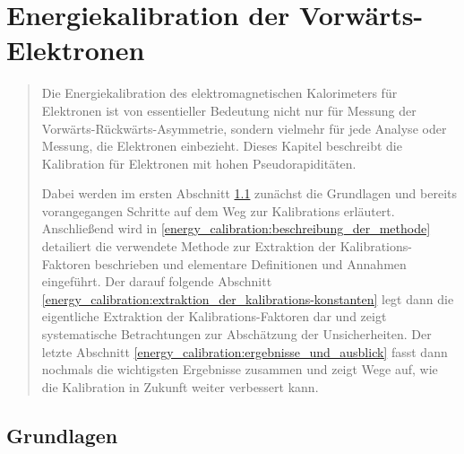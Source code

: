 


%
\chapter{Energiekalibration der Vorwärts-Elektronen}
\label{energy_calibration}

\begin{quote}
    Die Energiekalibration des elektromagnetischen Kalorimeters für Elektronen 
    ist von essentieller Bedeutung nicht nur für Messung der
    Vorwärts-Rückwärts-Asymmetrie, sondern vielmehr für jede Analyse oder
    Messung, die Elektronen einbezieht. Dieses Kapitel beschreibt die
    Kalibration für Elektronen mit hohen Pseudorapiditäten.

    Dabei werden im ersten Abschnitt \ref{energy_calibration:grundlagen}
    zunächst die Grundlagen und bereits vorangegangen Schritte auf dem Weg zur
    Kalibrations erläutert. Anschließend wird in
    \ref{energy_calibration:beschreibung_der_methode} detailiert die verwendete
    Methode zur Extraktion der Kalibrations-Faktoren beschrieben und elementare
    Definitionen und Annahmen eingeführt. Der darauf folgende Abschnitt
    \ref{energy_calibration:extraktion_der_kalibrations-konstanten} legt dann
    die eigentliche Extraktion der Kalibrations-Faktoren dar und zeigt
    systematische Betrachtungen zur Abschätzung der Unsicherheiten. Der letzte
    Abschnitt \ref{energy_calibration:ergebnisse_und_ausblick} fasst dann
    nochmals die wichtigsten Ergebnisse zusammen und zeigt Wege auf, wie die
    Kalibration in Zukunft weiter verbessert kann.
\end{quote}



%
\section{Grundlagen}
\label{energy_calibration:grundlagen}


